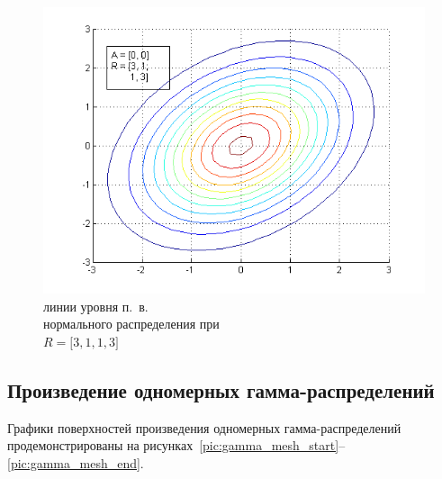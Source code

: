 \begin{figure}[h!]
  \centering
  \includegraphics[width=0.5\linewidth]{pic/new/normal_contour_3}
  \caption{линии уровня п.~в. \\
    нормального распределения при \\
    $ R = \big[3, 1, 1, 3 \big] $}
  \label{pic:normal_contour_end}
\end{figure}

\newpage 

\subsection{Произведение одномерных гамма-распределений}

Графики поверхностей произведения одномерных гамма-распределений
продемонстрированы 
на рисунках~\ref{pic:gamma_mesh_start}--\ref{pic:gamma_mesh_end}.

